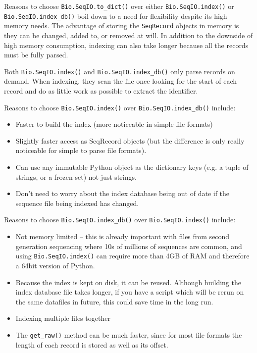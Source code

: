 Reasons to choose \verb|Bio.SeqIO.to_dict()| over either
\verb|Bio.SeqIO.index()| or \verb|Bio.SeqIO.index_db()| boil down to a need
for flexibility despite its high memory needs. The advantage of storing the
\verb|SeqRecord| objects in memory is they can be changed, added to, or
removed at will. In addition to the downside of high memory consumption,
indexing can also take longer because all the records must be fully parsed.

Both \verb|Bio.SeqIO.index()| and \verb|Bio.SeqIO.index_db()| only parse
records on demand. When indexing, they scan the file once looking for the
start of each record and do as little work as possible to extract the
identifier.

Reasons to choose \verb|Bio.SeqIO.index()| over \verb|Bio.SeqIO.index_db()|
include:
\begin{itemize}
\item Faster to build the index (more noticeable in simple file formats)
\item Slightly faster access as SeqRecord objects (but the difference is only
really noticeable for simple to parse file formats).
\item Can use any immutable Python object as the dictionary keys (e.g. a
tuple of strings, or a frozen set) not just strings.
\item Don't need to worry about the index database being out of date if the
sequence file being indexed has changed.
\end{itemize}

Reasons to choose \verb|Bio.SeqIO.index_db()| over \verb|Bio.SeqIO.index()|
include:
\begin{itemize}
\item Not memory limited -- this is already important with files from second
generation sequencing where 10s of millions of sequences are common, and
using \verb|Bio.SeqIO.index()| can require more than 4GB of RAM and therefore
a 64bit version of Python.
\item Because the index is kept on disk, it can be reused. Although building
the index database file takes longer, if you have a script which will be
rerun on the same datafiles in future, this could save time in the long run.
\item Indexing multiple files together
\item The \verb|get_raw()| method can be much faster, since for most file
formats the length of each record is stored as well as its offset.
\end{itemize}

